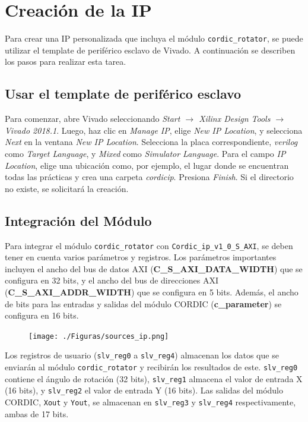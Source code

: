\documentclass[12pt,a4paper, twoside]{article} %
\begin{document}
\newpage

\section{Creación de la IP}

Para crear una IP personalizada que incluya el módulo \texttt{cordic\_rotator}, se puede utilizar el template de periférico esclavo de Vivado. A continuación se describen los pasos para realizar esta tarea.

\subsection{Usar el template de periférico esclavo}

Para comenzar, abre Vivado seleccionando \textit{Start $\rightarrow$ Xilinx Design Tools $\rightarrow$ Vivado 2018.1}. Luego, haz clic en \textit{Manage IP}, elige \textit{New IP Location}, y selecciona \textit{Next} en la ventana \textit{New IP Location}. Selecciona la placa correspondiente, \textit{verilog} como \textit{Target Language}, y \textit{Mixed} como \textit{Simulator Language}. Para el campo \textit{IP Location}, elige una ubicación como, por ejemplo, el lugar donde se encuentran todas las prácticas y crea una carpeta \textit{cordic\textunderscore ip}. Presiona \textit{Finish}. Si el directorio no existe, se solicitará la creación.

\subsection{Integración del Módulo}


Para integrar el módulo \texttt{cordic\_rotator} con \texttt{Cordic\_ip\_v1\_0\_S\_AXI}, se deben tener en cuenta varios parámetros y registros. Los parámetros importantes incluyen el ancho del bus de datos AXI (\textbf{C\_S\_AXI\_DATA\_WIDTH}) que se configura en 32 bits, y el ancho del bus de direcciones AXI (\textbf{C\_S\_AXI\_ADDR\_WIDTH}) que se configura en 5 bits. Además, el ancho de bits para las entradas y salidas del módulo CORDIC (\textbf{c\_parameter}) se configura en 16 bits.

\begin{figure}[ht]
\centering
\texttt{[image: ./Figuras/sources\_ip.png]}
\label{fig:Integración de modulos IP}
\end{figure}


Los registros de usuario (\texttt{slv\_reg0} a \texttt{slv\_reg4}) almacenan los datos que se enviarán al módulo \texttt{cordic\_rotator} y recibirán los resultados de este. \texttt{slv\_reg0} contiene el ángulo de rotación (32 bits), \texttt{slv\_reg1} almacena el valor de entrada X (16 bits), y \texttt{slv\_reg2} el valor de entrada Y (16 bits). Las salidas del módulo CORDIC, \texttt{Xout} y \texttt{Yout}, se almacenan en \texttt{slv\_reg3} y \texttt{slv\_reg4} respectivamente, ambas de 17 bits.
\end{document}
